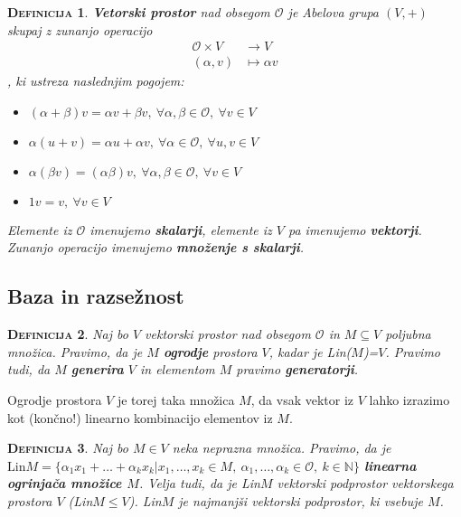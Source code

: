 \documentclass[a4paper,12pt]{article}
\newtheorem*{definicija}{\textsc{Definicija}}
\begin{document}
\begin{definicija}
\textbf{Vetorski prostor} nad obsegom $\mathcal{O}$ je Abelova grupa $(V,+)$ skupaj z zunanjo operacijo \begin{align*} \mathcal{O} \times V & \to V \\ (\alpha,v) & \mapsto \alpha v \end{align*}, ki ustreza naslednjim pogojem: 
	\begin{itemize}
		\item $(\alpha + \beta)v=\alpha v + \beta v,~\forall \alpha,\beta \in \mathcal{O},~\forall v\in V$
		\item $\alpha (u+v)=\alpha u+\alpha v,~\forall \alpha \in \mathcal{O},~\forall u,v\in V$
		\item $\alpha(\beta v)=(\alpha \beta)v,~\forall \alpha,\beta \in \mathcal{O},~\forall v\in V$
		\item $1v=v,~\forall v\in V$\\
	\end{itemize}
Elemente iz $\mathcal{O}$ imenujemo \textbf{skalarji}, elemente iz $V$ pa imenujemo \textbf{vektorji}. Zunanjo operacijo imenujemo \textbf{množenje s skalarji}.\\
\end{definicija}

\subsection{Baza in razsežnost}

\begin{definicija}
Naj bo $V$ vektorski prostor nad obsegom $\mathcal{O}$ in $M \subseteq V$ poljubna množica. Pravimo, da je $M$ \textbf{ogrodje} prostora $V$, kadar je Lin($M$)=$V$. Pravimo tudi, da $M$ \textbf{generira} $V$ in elementom $M$ pravimo \textbf{generatorji}.\\
\end{definicija}

\noindent Ogrodje prostora $V$ je torej taka množica $M$, da vsak vektor iz $V$ lahko izrazimo kot (končno!) linearno kombinacijo elementov iz $M$. \\

\begin{definicija}
	Naj bo $M\in V$ neka neprazna množica. Pravimo, da je $\text{Lin}M=\{\alpha_1 x_1+\ldots+\alpha_k x_k | x_1,\ldots,x_k \in M,~\alpha_1,\ldots,\alpha_k\in \mathcal{O},~k\in  \mathbb{N}\}$ \textbf{linearna ogrinjača množice $M$}. Velja tudi, da je Lin$M$ vektorski podprostor vektorskega prostora $V$ (Lin$M\leq V$). Lin$M$ je najmanjši vektorski podprostor, ki vsebuje $M$. 
\end{definicija}
\end{document}
